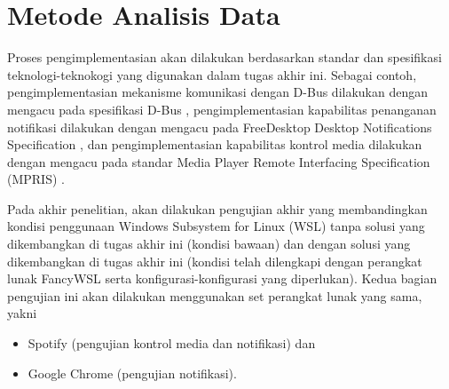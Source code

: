 \section{Metode Analisis Data}

Proses pengimplementasian akan dilakukan berdasarkan standar dan spesifikasi teknologi-teknokogi yang digunakan dalam tugas akhir ini. Sebagai contoh, pengimplementasian mekanisme komunikasi dengan D-Bus dilakukan dengan mengacu pada spesifikasi D-Bus \cite{dbus-specification}, pengimplementasian kapabilitas penanganan notifikasi dilakukan dengan mengacu pada FreeDesktop Desktop Notifications Specification \cite{xdg-desktop-notifications-specification}, dan pengimplementasian kapabilitas kontrol media dilakukan dengan mengacu pada standar Media Player Remote Interfacing Specification (MPRIS) \cite{xdg-mpris-specification}.

Pada akhir penelitian, akan dilakukan pengujian akhir yang membandingkan kondisi penggunaan Windows Subsystem for Linux (WSL) tanpa solusi yang dikembangkan di tugas akhir ini (kondisi bawaan) dan dengan solusi yang dikembangkan di tugas akhir ini (kondisi telah dilengkapi dengan perangkat lunak FancyWSL serta konfigurasi-konfigurasi yang diperlukan). Kedua bagian pengujian ini akan dilakukan menggunakan set perangkat lunak yang sama, yakni
\begin{itemize}
    \item Spotify (pengujian kontrol media dan notifikasi) dan
    \item Google Chrome (pengujian notifikasi).
\end{itemize}

